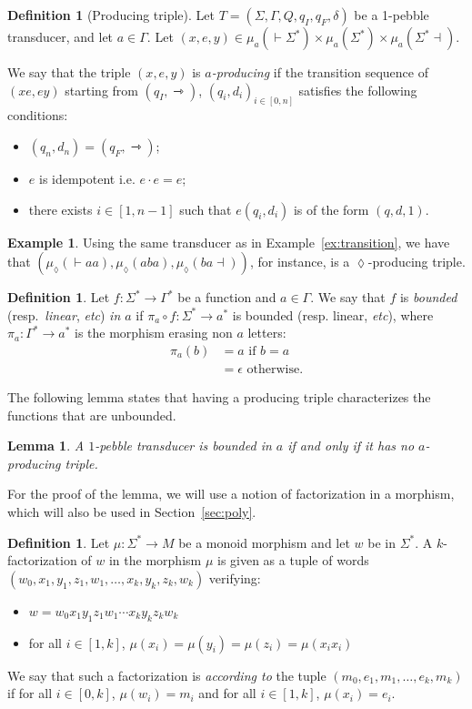 \documentclass[sigplan,review,anonymous]{acmart}\settopmatter{printfolios=true,printccs=false,printacmref=false}
\newcommand{\mright}{\rightarrowtriangle}
\newtheorem{lemma}[theorem]{Lemma}
\theoremstyle{definition}
\newtheorem{definition}[theorem]{Definition}
\newtheorem{example}[theorem]{Example}
\theoremstyle{remark}
\begin{document}
\begin{definition}[Producing triple]
Let $T=(\Sigma,\Gamma,Q,q_I,q_F, \delta)$ be a 1-pebble transducer, and let $a\in \Gamma$. Let $(x, e, y)\in \mu_a( { \vdash}\Sigma^*)\times \mu_a( \Sigma^*)\times \mu_a( \Sigma^*{ \dashv})$.

We say that the triple $(x,e,y)$ is \emph{$a$-producing} if the transition sequence of $(xe,ey)$ starting from $(q_I,\mright)$, 
$(q_i,d_i)_{i\in[0,n]}$ satisfies the following conditions:
\begin{itemize}
\item $(q_n,d_n)=(q_F,\mright)$;
\item $e$ is idempotent i.e. $e\cdot e=e$;
\item there exists $i\in [1,n-1]$ such that $e(q_i,d_i)$ is of the form $(q,d,1)$.
\end{itemize}
\end{definition}
\begin{example}
  Using the same transducer as in Example~\ref{ex:transition}, we have that $(\mu_\lozenge({\vdash} aa),\mu_\lozenge(aba),\mu_\lozenge(ba{\dashv}))$, for instance, is a $\lozenge$-producing triple.

\end{example}


\begin{definition}
Let $f:\Sigma^*\to \Gamma^*$ be a function and $a\in\Gamma$. We say that $f$ is \emph{bounded} (resp.~\emph{linear}, \textit{etc}) \emph{in $a$} if $\pi_a\circ f: \Sigma^*\to a^*$ is bounded (resp. linear, \textit{etc}), where $\pi_a:\Gamma^*\to a^*$ is the morphism erasing non $a$ letters:
\begin{align*}
\pi_a(b)&=a \text{ if }  b=a \\
&= \epsilon \text{ otherwise.}
\end{align*}
 \end{definition}
The following lemma states that having a producing triple characterizes the functions that are unbounded.
\begin{lemma}\label{thm:linear}
A $1$-pebble transducer is bounded in $a$ if and only if it has no $a$-producing triple.
\end{lemma}
For the proof of the lemma, we will use a notion of factorization in a morphism, which will also be used in Section~\ref{sec:poly}.

\begin{definition}
    Let $\mu:\Sigma^*\to M$ be a monoid morphism and let $w$ be in $ \Sigma^*$.
    A $k$-factorization of $w$ in the morphism $\mu$ is given as a tuple of words $(w_0,x_{1},y_1,z_1,w_1,\ldots,x_k,y_k,z_k, w_k)$ verifying:
    \begin{itemize}   
        \item  $w=w_0x_1y_1z_1w_1\cdots x_ky_kz_kw_k$
        \item for all $i\in [1,k]$, $\mu(x_i)=\mu(y_i)=\mu(z_i)=\mu(x_ix_i)$
    \end{itemize}
    We say that such a factorization is \emph{according to} the tuple $(m_0,e_1,m_1,\ldots,e_k,m_k)$ if for all $i\in [0,k]$, $\mu(w_i)=m_i$ and for all $i\in [1,k]$, $\mu(x_{i})=e_i$.
\end {definition}
\end{document}
